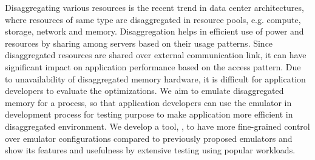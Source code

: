 \begin{Abstract}
Disaggregating various resources is the recent trend in data center architectures, where resources of same type are disaggregated in resource pools, e.g. compute, storage, network and memory. Disaggregation helps in efficient use of power and resources by sharing among servers based on their usage patterns. Since disaggregated resources are shared over external communication link, it can have significant impact on application performance based on the access pattern. Due to unavailability of disaggregated memory hardware, it is difficult for application developers to evaluate the optimizations. We aim to emulate disaggregated memory for a process, so that application developers can use the emulator in development process for testing purpose to make application more efficient in disaggregated environment. We develop a tool, {\dime}, to have more fine-grained control over emulator configurations compared to previously proposed emulators and show its features and usefulness by extensive testing using popular workloads.
%
%
%
%
%
\end{Abstract}

